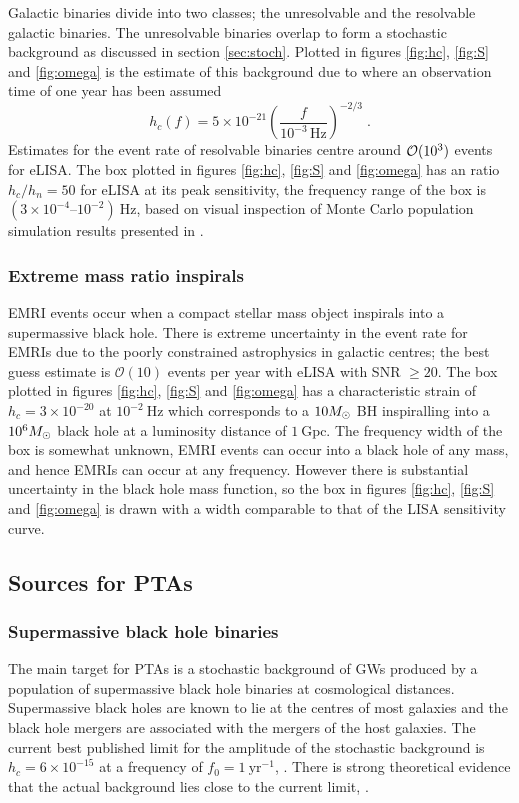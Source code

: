 {Galactic binaries divide into two classes; the unresolvable and the resolvable galactic binaries. The unresolvable binaries overlap to form a stochastic background as discussed in section \ref{sec:stoch}. Plotted in figures \ref{fig:hc}, \ref{fig:S} and \ref{fig:omega} is the estimate of this background 
due to \cite{Nelemans} where an observation time of one year has been assumed
\begin{equation} h_{c}(f)= 5\times 10^{-21} \left(\frac{f}{10^{-3}\,\textrm{Hz}}\right)^{-2/3} \; . \end{equation}
Estimates for the event rate of resolvable binaries centre around ${\cal{O}}(10^{3})$ events for eLISA. The box plotted in figures \ref{fig:hc}, \ref{fig:S} and \ref{fig:omega} has an ratio $h_{c}/h_{n}=50$ for eLISA at its peak sensitivity, the frequency range of the box is $\left(3\times10^{-4}\right.$--$\left.10^{-2}\right)~\mathrm{Hz}$, based on visual inspection of Monte Carlo population simulation results presented in \cite{Amaro-Seoane-et-al}.

\subsubsection{Extreme mass ratio inspirals}
EMRI events occur when a compact stellar mass object inspirals into a supermassive black hole. There is extreme uncertainty in the event rate for EMRIs due to the poorly constrained astrophysics in galactic centres; the best guess estimate is ${\mathcal{O}}(10)$ events per year with eLISA with SNR $\ge 20$. The box plotted in figures \ref{fig:hc}, \ref{fig:S} and \ref{fig:omega} has a characteristic strain of $h_{c}=3\times 10^{-20}$ at $10^{-2}~\mathrm{Hz}$ which corresponds to a $10M_{ \odot }$ BH inspiralling into a $10^{6}M_{ \odot }$ black hole at a luminosity distance of $1~\mathrm{Gpc}$. The frequency width of the box is somewhat unknown, EMRI events can occur into a black hole of any mass, and hence EMRIs can occur at any frequency. However there is substantial uncertainty in the black hole mass function, so the box in figures \ref{fig:hc}, \ref{fig:S} and \ref{fig:omega} is drawn with a width comparable to that of the LISA sensitivity curve.




\subsection{Sources for PTAs}

\subsubsection{Supermassive black hole binaries}
The main target for PTAs is a stochastic background of GWs produced by a population of supermassive black hole binaries at cosmological distances. Supermassive black holes are known to lie at the centres of most galaxies and the black hole mergers are associated with the mergers of the host galaxies. The current best published limit for the amplitude of the stochastic background is $h_{c} = 6\times 10^{-15}$ at a frequency of $f_{0}=1~\mathrm{yr}^{-1}$, \cite{Haasteren}. There is strong theoretical evidence that the actual background lies close to the current limit, \cite{Sesana-2012}. 

}
